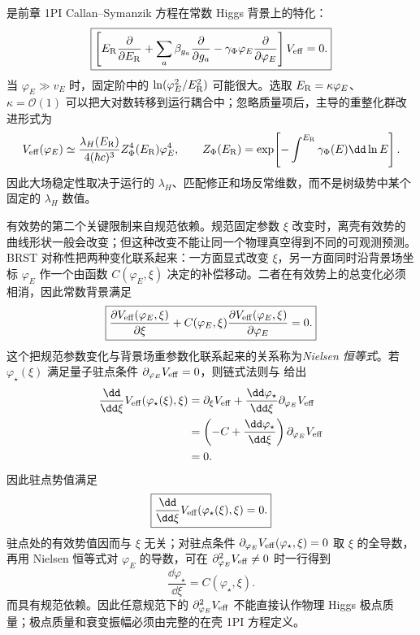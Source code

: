 是前章 1PI Callan--Symanzik 方程在常数 Higgs 背景上的特化：
\begin{equation}
\boxed{
\left[
E_{\rm R}\frac{\partial}{\partial E_{\rm R}}
+\sum_a\beta_{g_a}\frac{\partial}{\partial g_a}
-\gamma_\Phi\varphi_E\frac{\partial}{\partial\varphi_E}
\right]V_{\rm eff}=0.}
\label{eq:sm-effective-potential-rg-equation-dp12}
\end{equation}
当 $\varphi_E\gg v_E$ 时，固定阶中的 $\ln(\varphi_E^2/E_{\rm R}^2)$ 可能很大。选取 $E_{\rm R}=\kappa\varphi_E$、$\kappa=\mathcal O(1)$ 可以把大对数转移到运行耦合中；忽略质量项后，主导的重整化群改进形式为
\begin{equation*}
V_{\rm eff}(\varphi_E)
\simeq\frac{\lambda_H(E_{\rm R})}{4(\hbar c)^3}
Z_\Phi^4(E_{\rm R})\varphi_E^4,
\qquad
Z_\Phi(E_{\rm R})
=\exp\!\left[-\int^{E_{\rm R}}\gamma_\Phi(E)\dd\ln E\right].
\end{equation*}
因此大场稳定性取决于运行的 $\lambda_H$、匹配修正和场反常维数，而不是树级势中某个固定的 $\lambda_H$ 数值。

有效势的第二个关键限制来自规范依赖。规范固定参数 $\xi$ 改变时，离壳有效势的曲线形状一般会改变；但这种改变不能让同一个物理真空得到不同的可观测预测。BRST 对称性把两种变化联系起来：一方面显式改变 $\xi$，另一方面同时沿背景场坐标 $\varphi_E$ 作一个由函数 $C(\varphi_E,\xi)$ 决定的补偿移动。二者在有效势上的总变化必须相消，因此常数背景满足
\begin{equation}
\boxed{
\frac{\partial V_{\rm eff}(\varphi_E,\xi)}{\partial\xi}
+C(\varphi_E,\xi)
\frac{\partial V_{\rm eff}(\varphi_E,\xi)}{\partial\varphi_E}=0.}
\label{eq:sm-nielsen-identity-dp12}
\end{equation}
这个把规范参数变化与背景场重参数化联系起来的关系称为\emph{Nielsen 恒等式}。若 $\varphi_\star(\xi)$ 满足量子驻点条件 $\partial_{\varphi_E}V_{\rm eff}=0$，则链式法则与 给出
\begin{align*}
\frac{\dd}{\dd\xi}V_{\rm eff}(\varphi_\star(\xi),\xi)
&=\partial_\xi V_{\rm eff}
+\frac{\dd\varphi_\star}{\dd\xi}\partial_{\varphi_E}V_{\rm eff}\\
&=\left(-C+\frac{\dd\varphi_\star}{\dd\xi}\right)
\partial_{\varphi_E}V_{\rm eff}\\
&=0.
\end{align*}
因此驻点势值满足
\begin{equation}
\boxed{
\frac{\dd}{\dd\xi}
V_{\rm eff}(\varphi_\star(\xi),\xi)=0.}
\label{eq:sm-nielsen-stationary-value-dp68}
\end{equation}
驻点处的有效势值因而与 $\xi$ 无关；对驻点条件 $\partial_{\varphi_E}V_{\rm eff}(\varphi_\star,\xi)=0$ 取 $\xi$ 的全导数，再用 Nielsen 恒等式对 $\varphi_E$ 的导数，可在 $\partial_{\varphi_E}^2V_{\rm eff}\neq0$ 时一行得到
\begin{equation*}
\frac{\dd\varphi_\star}{\dd\xi}=C(\varphi_\star,\xi).
\end{equation*}
而具有规范依赖。因此任意规范下的 $\partial_{\varphi_E}^2V_{\rm eff}$ 不能直接认作物理 Higgs 极点质量；极点质量和衰变振幅必须由完整的在壳 1PI 方程定义。

